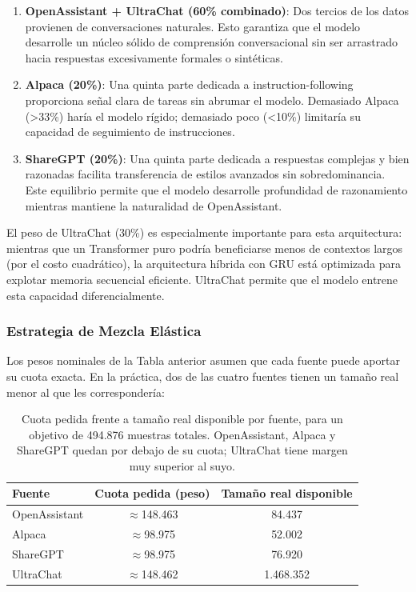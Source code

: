 \begin{enumerate}
    \item \textbf{OpenAssistant + UltraChat (60\% combinado)}: Dos tercios de los datos provienen de conversaciones naturales. Esto garantiza que el modelo desarrolle un núcleo sólido de comprensión conversacional sin ser arrastrado hacia respuestas excesivamente formales o sintéticas.

    \item \textbf{Alpaca (20\%)}: Una quinta parte dedicada a instruction-following proporciona señal clara de tareas sin abrumar el modelo. Demasiado Alpaca (>33\%) haría el modelo rígido; demasiado poco (<10\%) limitaría su capacidad de seguimiento de instrucciones.

    \item \textbf{ShareGPT (20\%)}: Una quinta parte dedicada a respuestas complejas y bien razonadas facilita transferencia de estilos avanzados sin sobredominancia. Este equilibrio permite que el modelo desarrolle profundidad de razonamiento mientras mantiene la naturalidad de OpenAssistant.
\end{enumerate}

El peso de UltraChat (30\%) es especialmente importante para esta arquitectura: mientras que un Transformer puro podría beneficiarse menos de contextos largos (por el costo cuadrático), la arquitectura híbrida con GRU está optimizada para explotar memoria secuencial eficiente. UltraChat permite que el modelo entrene esta capacidad diferencialmente.

\subsubsection{Estrategia de Mezcla Elástica}
\label{subsec:mezcla_elastica}

Los pesos nominales de la Tabla anterior asumen que cada fuente puede aportar su cuota exacta. En la práctica, dos de las cuatro fuentes tienen un tamaño real menor al que les correspondería:

\begin{table}[H]
\centering
\begin{tabularx}{\textwidth}{|X|c|c|}
\hline
\textbf{Fuente} & \textbf{Cuota pedida (peso)} & \textbf{Tamaño real disponible} \\ \hline
OpenAssistant & $\approx$148.463 & 84.437 \\ \hline
Alpaca & $\approx$98.975 & 52.002 \\ \hline
ShareGPT & $\approx$98.975 & 76.920 \\ \hline
UltraChat & $\approx$148.462 & 1.468.352 \\ \hline
\end{tabularx}
\caption{Cuota pedida frente a tamaño real disponible por fuente, para un objetivo de 494.876 muestras totales. OpenAssistant, Alpaca y ShareGPT quedan por debajo de su cuota; UltraChat tiene margen muy superior al suyo.}
\label{tab:mezcla_elastica}
\end{table}

